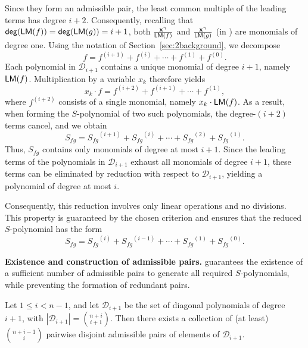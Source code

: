 Since they form an admissible pair, the least common multiple of the leading terms has degree $i+2$.
Consequently, recalling that $\mathsf{deg}(\mathsf{LM}(f))=\mathsf{deg}(\mathsf{LM}(g))=i+1$, both $\frac{\mathbf{x}^\gamma}{\mathsf{LM}(f)}$ and $\frac{\mathbf{x}^\gamma}{\mathsf{LM}(g)}$ (in ) are monomials of degree one. Using the notation of Section~\ref{sec:2background}, we decompose
\[
    f = f^{(i+1)} + f^{(i)} + \cdots + f^{(1)} + f^{(0)}.
\] 
Each polynomial in $\mathcal{D}_{i+1}$ contains a unique monomial of degree $i+1$, namely $\mathsf{LM}(f)$.
Multiplication by a variable $x_k$ therefore yields
\[
    x_k \cdot f = f^{(i+2)} + f^{(i+1)} + \cdots + f^{(1)},
\]
where $f^{(i+2)}$ consists of a single monomial, namely $x_k \cdot \mathsf{LM}(f)$.
As a result, when forming the $S$-polynomial of two such polynomials, the degree-$(i+2)$ terms cancel, and we obtain
\[
    S_{fg} = {S_{fg}}^{(i+1)} + {S_{fg}}^{(i)} + \cdots + {S_{fg}}^{(2)} + {S_{fg}}^{(1)}.
\]
Thus, $S_{fg}$ contains only monomials of degree at most $i+1$.
Since the leading terms of the polynomials in $\mathcal{D}_{i+1}$ exhaust all monomials of degree $i+1$, these terms can be eliminated by reduction with respect to $\mathcal{D}_{i+1}$, yielding a polynomial of degree at most $i$.

Consequently, this reduction involves only linear operations and no divisions.
This property is guaranteed by the chosen criterion and ensures that the reduced $S$-polynomial has the form
\[
    S_{fg} = {S_{fg}}^{(i)} + {S_{fg}}^{(i-1)} + \cdots + {S_{fg}}^{(1)} + {S_{fg}}^{(0)}.
\]



\noindent
\textbf{Existence and construction of admissible pairs.} 
 guarantees the existence of a sufficient number of admissible pairs to generate all required $S$-polynomials, while preventing the formation of redundant pairs.

\begin{lemma}\label{lemma:spoly_number}

Let $1 \le i < n-1$, and let $\mathcal{D}_{i+1}$ be the set of diagonal polynomials of degree $i+1$, with $|\mathcal{D}_{i+1}| = \binom{n+i}{i+1}$.
Then there exists a collection of (at least) $\binom{n+i-1}{i}$ pairwise disjoint admissible pairs of elements of $\mathcal{D}_{i+1}$.

\end{lemma}

